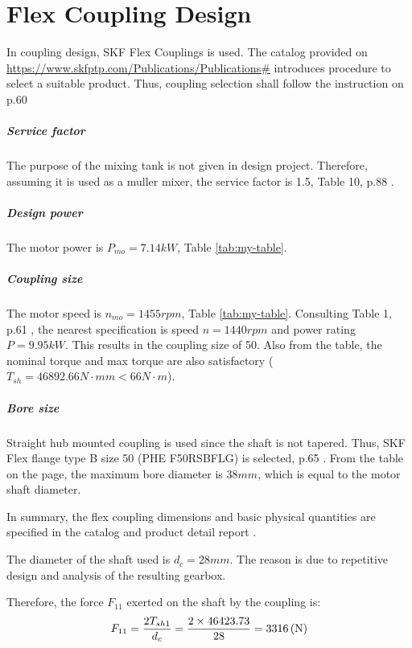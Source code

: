 \chapter{Flex Coupling Design}

In coupling design, SKF Flex Couplings is used. The catalog provided on \url{https://www.skfptp.com/Publications/Publications#} introduces procedure to select a suitable product. Thus, coupling selection shall follow the instruction on p.60 \cite{skf_2018}

\paragraph{Service factor} The purpose of the mixing tank is not given in design project. Therefore, assuming it is used as a muller mixer, the service factor is 1.5, Table 10, p.88 \cite{skf_2018}.

\paragraph{Design power}
The motor power is $ P_{mo} = 7.14 \unit{kW} $, Table \ref{tab:my-table}.

\paragraph{Coupling size}
The motor speed is $ n_{mo} = 1455 \unit{rpm} $, Table \ref{tab:my-table}. Consulting Table 1, p.61 \cite{skf_2018}, the nearest specification is speed $ n = 1440 \unit{rpm} $ and power rating $ P = 9.95 \unit{kW} $. This results in the coupling size of 50. Also from the table, the nominal torque and max torque are also satisfactory ($ T_{sh} = 46892.66 \unit{N\cdot mm} < 66 \unit{N\cdot m}$).

\paragraph{Bore size}
Straight hub mounted coupling is used since the shaft is not tapered. Thus, SKF Flex flange type B size 50 (PHE F50RSBFLG) is selected, p.65 \cite{skf_2018}. From the table on the page, the maximum bore diameter is $ 38\unit{mm} $, which is equal to the motor shaft diameter.

In summary, the flex coupling dimensions and basic physical quantities are specified in the catalog \cite{skf_2018} and product detail report \cite{bibid}.

The diameter of the shaft used is $ d_c = 28\unit{mm} $. The reason is due to repetitive design and analysis of the resulting gearbox.

Therefore, the force $ F_{11} $ exerted on the shaft by the coupling is:
\[
F_{11} = \dfrac{2T_{sh1}}{d_c} = \dfrac{2\times 46423.73}{28} = 3316 \, (\mathrm{N})
\]